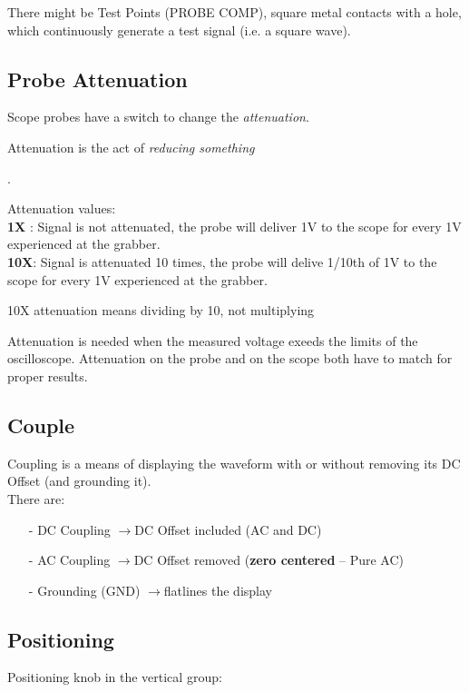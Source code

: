 \documentclass[a4paper, 12pt]{article}
\newcommand{\notebox}[1]{

 \begin{center}
  \begin{tcolorbox}[]
   #1 
  \end{tcolorbox}
 
 \end{center} 
 
}
\begin{document}
There might be Test Points (PROBE COMP), square metal contacts with a hole,
which continuously generate a test signal (i.e. a square wave).

\subsection*{Probe Attenuation}
Scope probes have a switch to change the \emph{attenuation}.\\

\notebox{ Attenuation is the act of \emph{reducing something}}.

Attenuation values:\\

\textbf{1X} : Signal is not attenuated, the probe will deliver 1V to the scope for every
1V experienced at the grabber.\\

\textbf{10X}: Signal is attenuated 10 times, the probe will delive 1/10th of 1V to the
scope for every 1V experienced at the grabber.\\

\notebox{ 10X attenuation means dividing by 10, not multiplying }

Attenuation is needed when the measured voltage exeeds the limits of the
oscilloscope. Attenuation on the probe and on the scope both have to match for proper results.

\subsection*{Couple}
Coupling is a means of displaying the waveform with or without removing its DC
Offset (and grounding it).\\

There are:

\begin{itemize}
  \item[-]{ DC Coupling }
    $\rightarrow $DC Offset included (AC and DC)
  \item[-]{ AC Coupling }
    $\rightarrow $DC Offset removed (\textbf{zero centered} -- Pure AC)
  \item[-]{ Grounding (GND)}
    $\rightarrow $flatlines the display
\end{itemize}

\subsection*{Positioning}
Positioning knob in the vertical group:\\
\end{document}
